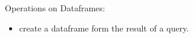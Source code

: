 Operations on Dataframes:
\begin{itemize}
    \item create a dataframe form the result of a \sparql query.
    
\end{itemize}{}

